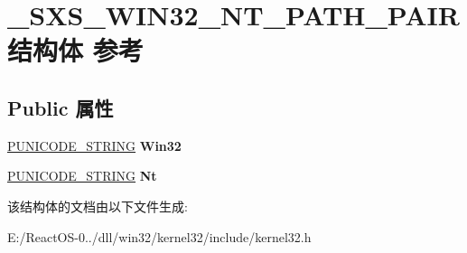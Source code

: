 \hypertarget{struct___s_x_s___w_i_n32___n_t___p_a_t_h___p_a_i_r}{}\section{\+\_\+\+S\+X\+S\+\_\+\+W\+I\+N32\+\_\+\+N\+T\+\_\+\+P\+A\+T\+H\+\_\+\+P\+A\+I\+R结构体 参考}
\label{struct___s_x_s___w_i_n32___n_t___p_a_t_h___p_a_i_r}
\subsection*{Public 属性}
\begin{DoxyCompactItemize}
\item 
\mbox{\label{struct___s_x_s___w_i_n32___n_t___p_a_t_h___p_a_i_r_a358b2ae43a1e5b128ebff4eaf60e2f32}} 
\hyperlink{struct___u_n_i_c_o_d_e___s_t_r_i_n_g}{P\+U\+N\+I\+C\+O\+D\+E\+\_\+\+S\+T\+R\+I\+NG} {\bfseries Win32}
\item 
\mbox{\label{struct___s_x_s___w_i_n32___n_t___p_a_t_h___p_a_i_r_abcf31e06fa02965c578023dab3e24039}} 
\hyperlink{struct___u_n_i_c_o_d_e___s_t_r_i_n_g}{P\+U\+N\+I\+C\+O\+D\+E\+\_\+\+S\+T\+R\+I\+NG} {\bfseries Nt}
\end{DoxyCompactItemize}


该结构体的文档由以下文件生成\+:\begin{DoxyCompactItemize}
\item 
E\+:/\+React\+O\+S-\/0../dll/win32/kernel32/include/kernel32.\+h\end{DoxyCompactItemize}
